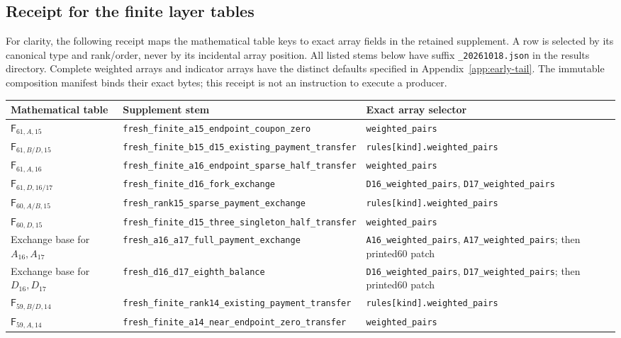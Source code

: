 \documentclass[11pt]{article}
\theoremstyle{remark}\newtheorem{remark}[theorem]{Remark}
\newcommand{\cert}[1]{\nolinkurl{#1}}
\begin{document}
\subsection*{Receipt for the finite layer tables}

For clarity, the following receipt maps the mathematical table keys
to exact array fields in the retained supplement. A row is selected
by its canonical type and rank/order, never by its incidental array
position. All listed stems below have suffix
\cert{_20261018.json} in the results directory. Complete weighted
arrays and indicator arrays have the distinct defaults specified in
Appendix~\ref{app:early-tail}. The immutable composition manifest binds
their exact bytes; this receipt is not an instruction to execute a
producer.

{\scriptsize
\begin{longtable}{@{}p{}p{}p{}@{}}
\toprule Mathematical table&Supplement stem&Exact array selector\\\midrule
\endhead
$\mathsf F_{61,A,15}$&\cert{fresh_finite_a15_endpoint_coupon_zero}&\cert{weighted_pairs}\\
$\mathsf F_{61,B/D,15}$&\cert{fresh_finite_b15_d15_existing_payment_transfer}&\cert{rules[kind].weighted_pairs}\\
$\mathsf F_{61,A,16}$&\cert{fresh_finite_a16_endpoint_sparse_half_transfer}&\cert{weighted_pairs}\\
$\mathsf F_{61,D,16/17}$&\cert{fresh_finite_d16_fork_exchange}&\cert{D16_weighted_pairs}, \cert{D17_weighted_pairs}\\
$\mathsf F_{60,A/B,15}$&\cert{fresh_rank15_sparse_payment_exchange}&\cert{rules[kind].weighted_pairs}\\
$\mathsf F_{60,D,15}$&\cert{fresh_finite_d15_three_singleton_half_transfer}&\cert{weighted_pairs}\\
Exchange base for$A_{16},A_{17}$&\cert{fresh_a16_a17_full_payment_exchange}&\cert{A16_weighted_pairs}, \cert{A17_weighted_pairs}; then printed60 patch\\
Exchange base for$D_{16},D_{17}$&\cert{fresh_d16_d17_eighth_balance}&\cert{D16_weighted_pairs}, \cert{D17_weighted_pairs}; then printed60 patch\\
$\mathsf F_{59,B/D,14}$&\cert{fresh_finite_rank14_existing_payment_transfer}&\cert{rules[kind].weighted_pairs}\\
$\mathsf F_{59,A,14}$&\cert{fresh_finite_a14_near_endpoint_zero_transfer}&\cert{weighted_pairs}\\

\end{longtable}}
\end{document}
